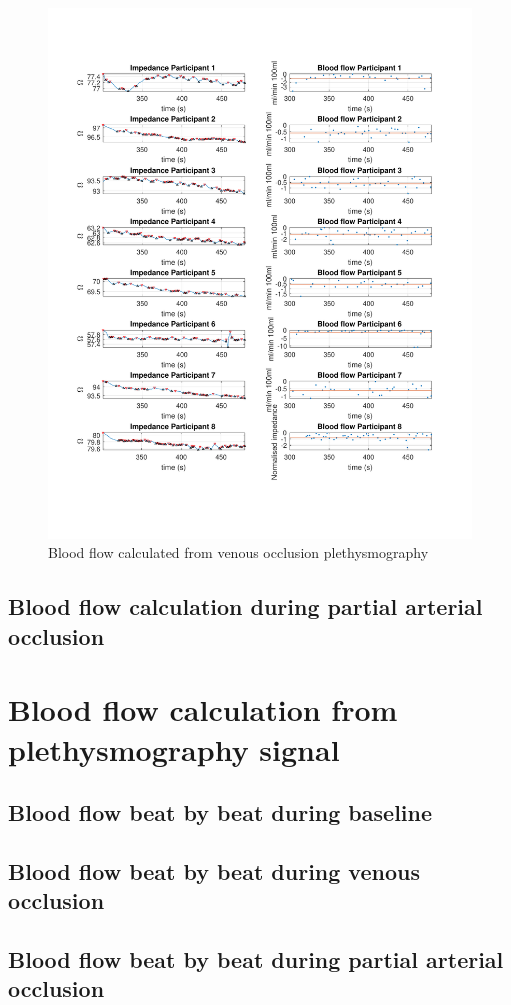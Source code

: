 \begin{figure}
	\includegraphics[width=\textwidth,height=\textheight,keepaspectratio,trim={0.5cm 0.5cm 2cm 2cm},clip]{figure6}    
	\caption{Blood flow calculated from venous occlusion plethysmography}
	\label{fig:blood_flow:venous_occlusion}
\end{figure}

\subsection{Blood flow calculation during partial arterial occlusion}
\label{section5.4.2}

\section{Blood flow calculation from plethysmography signal}
\label{section5.5}
\subsection{Blood flow beat by beat during baseline}
\label{section5.5.1}

\subsection{Blood flow beat by beat during venous occlusion}
\label{section5.5.2}

\subsection{Blood flow beat by beat during partial arterial occlusion}
\label{section5.5.3}
